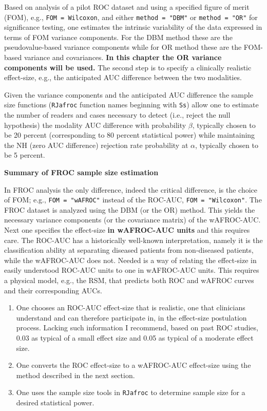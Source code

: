 \documentclass[
]{book}
\begin{document}
Based on analysis of a pilot ROC dataset and using a specified figure of merit (FOM), e.g., \texttt{FOM\ =\ Wilcoxon}, and either \texttt{method\ =\ "DBM"} or \texttt{method\ =\ "OR"} for significance testing, one estimates the intrinsic variability of the data expressed in terms of FOM variance components. For the DBM method these are the pseudovalue-based variance components while for OR method these are the FOM-based variance and covariances. \textbf{In this chapter the OR variance components will be used.} The second step is to specify a clinically realistic effect-size, e.g., the anticipated AUC difference between the two modalities.

Given the variance components and the anticipated AUC difference the sample size functions (\texttt{RJafroc} function names beginning with \texttt{Ss}) allow one to estimate the number of readers and cases necessary to detect (i.e., reject the null hypothesis) the modality AUC difference with probability \(\beta\), typically chosen to be 20 percent (corresponding to 80 percent statistical power) while maintaining the NH (zero AUC difference) rejection rate probability at \(\alpha\), typically chosen to be 5 percent.

\textbf{Summary of FROC sample size estimation}

In FROC analysis the only difference, indeed the critical difference, is the choice of FOM; e.g., \texttt{FOM\ =\ "wAFROC"} instead of the ROC-AUC, \texttt{FOM\ =\ "Wilcoxon"}. The FROC dataset is analyzed using the DBM (or the OR) method. This yields the necessary variance components (or the covariance matrix) of the wAFROC-AUC. Next one specifies the effect-size \textbf{in wAFROC-AUC units} and this requires care. The ROC-AUC has a historically well-known interpretation, namely it is the classification ability at separating diseased patients from non-diseased patients, while the wAFROC-AUC does not. Needed is a way of relating the effect-size in easily understood ROC-AUC units to one in wAFROC-AUC units. This requires a physical model, e.g., the RSM, that predicts both ROC and wAFROC curves and their corresponding AUCs.

\begin{enumerate}
\def\labelenumi{\arabic{enumi}.}
\item
  One chooses an ROC-AUC effect-size that is realistic, one that clinicians understand and can therefore participate in, in the effect-size postulation process. Lacking such information I recommend, based on past ROC studies, 0.03 as typical of a small effect size and 0.05 as typical of a moderate effect size.
\item
  One converts the ROC effect-size to a wAFROC-AUC effect-size using the method described in the next section.
\item
  One uses the sample size tools in \texttt{RJafroc} to determine sample size for a desired statistical power.
\end{enumerate}
\end{document}
